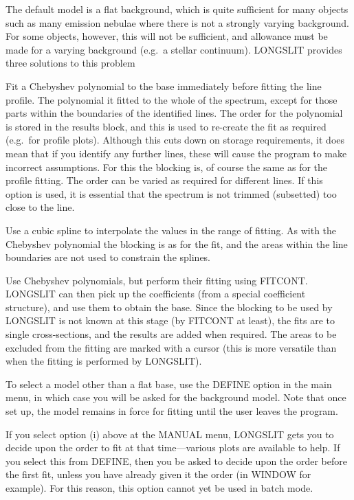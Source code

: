 The default model is a flat background, which is quite sufficient for
many objects such as many emission nebulae where there is not a strongly
varying background.
For some objects, however, this will not be sufficient, and allowance
must be made for a varying background (e.g.\ a stellar continuum).
LONGSLIT provides three solutions to this problem
\begin{list}{\bf{} ---}{}
\item
Fit a Chebyshev polynomial to the base immediately before fitting the
line profile.
The polynomial it fitted to the whole of the spectrum, except for those
parts within the boundaries of the identified lines.
The order for the polynomial is stored in the results block, and this is
used to re-create the fit as required (e.g.\ for profile plots).
Although this cuts down on storage requirements, it does mean that if
you identify any further lines, these will cause the program to make
incorrect assumptions.
For this the blocking is, of course the same as for the profile
fitting.
The order can be varied as required for different lines.
If this option is used, it is essential that the spectrum is not trimmed
(subsetted) too close to the line.
\item
Use a cubic spline to interpolate the values in the range of fitting.
As with the Chebyshev polynomial the blocking is as for the fit, and the
areas within the line boundaries are not used to constrain the splines.
\item
Use Chebyshev polynomials, but perform their fitting using FITCONT.
LONGSLIT can then pick up the coefficients (from a special coefficient
structure), and use them to obtain the base.
Since the blocking to be used by LONGSLIT is not known at this stage (by
FITCONT at least), the fits are to single cross-sections, and the
results are added when required.
The areas to be excluded from the fitting are marked with a cursor (this
is more versatile than when the fitting is performed by LONGSLIT).
\end{list}
To select a model other than a flat base, use the DEFINE option in the
main menu, in which case you will be asked for the background model.
Note that once set up, the model remains in force for fitting until the
user leaves the program.

If you select option (i) above at the MANUAL menu, LONGSLIT gets you to
decide upon the order to fit at that time---various plots are available
to help.
If you select this from DEFINE, then you be asked to decide upon the
order before the first fit, unless you have already given it the order
(in WINDOW for example).
For this reason, this option cannot yet be used in batch mode.

